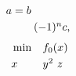 \documentclass{article}
\begin{document}
\begin{equation}
\begin{split}
a &= b \\
& \omit \hfill $\qquad (-1)^{n} c$,
\end{split}
\end{equation}
\begin{equation}
\begin{aligned}
&\min &\multicolumn{2}{l}{$f_0(x)$}\\
&x &\omit $y^2$ & z
\end{aligned}
\end{equation}
\end{document}
